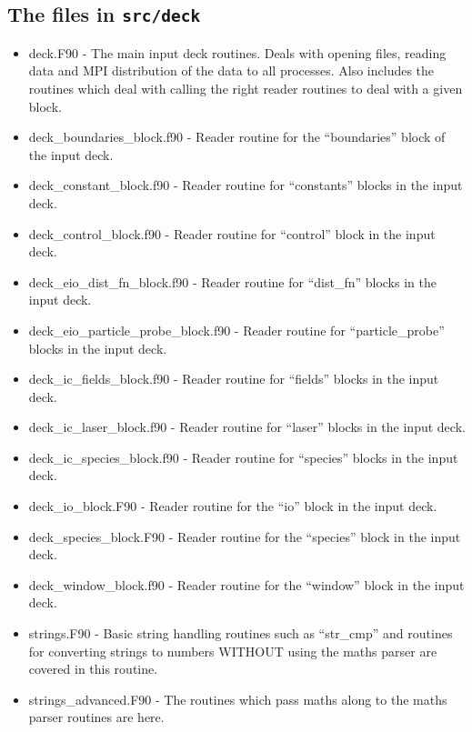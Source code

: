 \documentclass[12pt,a4paper]{article}
\newcommand{\inlinecode}[1]{{\color{warwickred} \bf\texttt{#1}}}
\begin{document}
\subsection{The files in \inlinecode{src/deck}}
\begin{itemize}
\item deck.F90 - The main input deck routines. Deals with opening files,
  reading data and MPI distribution of the data to all processes. Also
  includes the routines which deal with calling the right reader routines to
  deal with a given block.
\item deck\_boundaries\_block.f90 - Reader routine for the ``boundaries'' block
  of the input deck.
\item deck\_constant\_block.f90 - Reader routine for ``constants'' blocks in the
  input deck.
\item deck\_control\_block.f90 - Reader routine for ``control'' block in the
  input deck.
\item deck\_eio\_dist\_fn\_block.f90 - Reader routine for ``dist\_fn'' blocks in
  the input deck.
\item deck\_eio\_particle\_probe\_block.f90 - Reader routine for
  ``particle\_probe'' blocks in the input deck.
\item deck\_ic\_fields\_block.f90 - Reader routine for ``fields'' blocks in the
  input deck.
\item deck\_ic\_laser\_block.f90 - Reader routine for ``laser'' blocks in the
  input deck.
\item deck\_ic\_species\_block.f90 - Reader routine for ``species'' blocks in
  the input deck.
\item deck\_io\_block.F90 - Reader routine for the ``io'' block in the input
  deck.
\item deck\_species\_block.F90 - Reader routine for the ``species'' block in the
  input deck.
\item deck\_window\_block.f90 - Reader routine for the ``window'' block in the
  input deck.
\item strings.F90 - Basic string handling routines such as ``str\_cmp'' and
  routines for converting strings to numbers WITHOUT using the maths parser
  are covered in this routine.
\item strings\_advanced.F90 - The routines which pass maths along to the maths
  parser routines are here.
\end{itemize}
\end{document}
